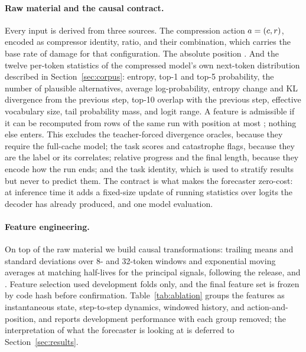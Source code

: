 \paragraph{Raw material and the causal contract.}
Every input is derived from three sources. The compression action
$a = (c, r)$, encoded as compressor identity, ratio, and their
combination, which carries the base rate of damage for that configuration.
The absolute position \step. And the twelve per-token statistics of the
compressed model's own next-token distribution described in
Section~\ref{sec:corpus}: entropy, top-1 and top-5 probability, the number of
plausible alternatives, average log-probability, entropy change and KL
divergence from the previous step, top-10 overlap with the previous step,
effective vocabulary size, tail probability mass, and logit range. A feature
is admissible if it can be recomputed from rows of the same run with
position at most \step; nothing else enters. This excludes the teacher-forced
divergence oracles, because they require the full-cache model; the task
scores and catastrophe flags, because they are the label or its
correlates; relative progress and the final length, because they encode how
the run ends; and the task identity, which is used to stratify results but
never to predict them. The contract is what makes the forecaster zero-cost:
at inference time it adds a fixed-size update of running statistics over
logits the decoder has already produced, and one model evaluation.

\paragraph{Feature engineering.}
On top of the raw material we build causal transformations: trailing means
and standard deviations over 8- and 32-token windows and exponential moving
averages at matching half-lives for the principal signals, following the
release, and .  Feature
selection used development folds only, and the final feature set is frozen
by code hash before confirmation. Table~\ref{tab:ablation} groups the
features as instantaneous state, step-to-step dynamics, windowed history,
and action-and-position, and reports development performance with each group
removed; the interpretation of what the forecaster is looking at is deferred
to Section~\ref{sec:results}.


